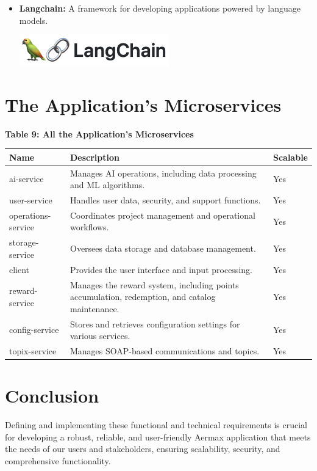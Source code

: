 \begin{itemize}
    \item \textbf{Langchain:} \newline A framework for developing applications powered by language models. \newline \newline
          \begin{minipage}{\linewidth}
              \centering
              \includegraphics[width=6.5cm]{src/assets/logos/langchain.png}
          \end{minipage}
\end{itemize}

\section{The Application’s Microservices}
\textbf{Table 9: All the Application’s Microservices}
\begin{longtable}{|p{3cm}|p{7cm}|p{2cm}|}
    \hline
    \textbf{Name} & \textbf{Description} & \textbf{Scalable} \\
    \hline
    \endhead
    ai-service & Manages AI operations, including data processing and ML algorithms. & Yes \\
    \hline
    user-service & Handles user data, security, and support functions. & Yes \\
    \hline
    operations-service & Coordinates project management and operational workflows. & Yes \\
    \hline
    storage-service & Oversees data storage and database management. & Yes \\
    \hline
    client & Provides the user interface and input processing. & Yes \\
    \hline
    reward-service & Manages the reward system, including points accumulation, redemption, and catalog maintenance. & Yes \\
    \hline
    config-service & Stores and retrieves configuration settings for various services. & Yes \\
    \hline
    topix-service & Manages SOAP-based communications and topics. & Yes \\
    \hline
\end{longtable}

\section{Conclusion}
Defining and implementing these functional and technical requirements is crucial for developing a robust, reliable, and user-friendly Aermax application that meets the needs of our users and stakeholders, ensuring scalability, security, and comprehensive functionality.